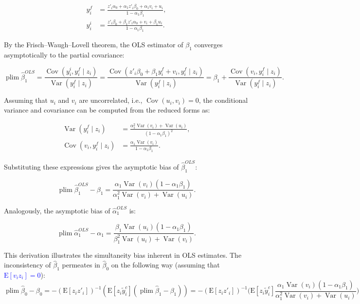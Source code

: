 \documentclass[12pt,oneside]{article}
\DeclareMathOperator*{\plim}{plim}
\theoremstyle{bracket}
\begin{document}
\begin{align}
    y^f_i &= \frac{z'_i \alpha_0 + \alpha_1 z'_i \beta_0 + \alpha_1 v_i + u_i}{1 - \alpha_1 \beta_1}, \\
    y^i_i &= \frac{z'_i \beta_0 + \beta_1 z'_i \alpha_0 + v_i + \beta_1 u_i}{1 - \alpha_1 \beta_1}.
\end{align}



By the Frisch–Waugh–Lovell theorem, the OLS estimator of $\beta_1$ converges asymptotically to the partial covariance:

\[
\plim \hat{\beta}_1^{OLS} = \frac{\operatorname{Cov}(y^i_i, y^f_i \mid z_i)}{\operatorname{Var}(y^f_i \mid z_i)}
= \frac{\operatorname{Cov}(z'_i \beta_0 + \beta_1 y^f_i + v_i, y^f_i \mid z_i)}{\operatorname{Var}(y^f_i \mid z_i)}
= \beta_1 + \frac{\operatorname{Cov}(v_i, y^f_i \mid z_i)}{\operatorname{Var}(y^f_i \mid z_i)}.
\]

Assuming that $u_i$ and $v_i$ are uncorrelated, i.e., $\operatorname{Cov}(u_i, v_i) = 0$, the conditional variance and covariance can be computed from the reduced forms as:

\begin{align}
    \operatorname{Var}(y^f_i \mid z_i) &= \frac{\alpha_1^2 \operatorname{Var}(v_i) + \operatorname{Var}(u_i)}{(1 - \alpha_1 \beta_1)^2}, \\
    \operatorname{Cov}(v_i, y^f_i \mid z_i) &= \frac{\alpha_1 \operatorname{Var}(v_i)}{1 - \alpha_1 \beta_1}.
\end{align}

Substituting these expressions gives the asymptotic bias of $\hat{\beta}_1^{OLS}$:

\[
\plim \hat{\beta}_1^{OLS} - \beta_1
= \frac{\alpha_1 \operatorname{Var}(v_i) (1 - \alpha_1 \beta_1)}{\alpha_1^2 \operatorname{Var}(v_i) + \operatorname{Var}(u_i)}.
\]

Analogously, the asymptotic bias of $\hat{\alpha}_1^{OLS}$ is:

\[
\plim \hat{\alpha}_1^{OLS} - \alpha_1
= \frac{\beta_1 \operatorname{Var}(u_i) (1 - \alpha_1 \beta_1)}{\beta_1^2 \operatorname{Var}(u_i) + \operatorname{Var}(v_i)}.
\]



This derivation illustrates the simultaneity bias inherent in OLS estimates.
The inconsistency of $\hat{\beta}_1$ permeates in $\hat{\beta}_0$ on the following way (assuming that \textcolor{blue}{$\mathrm{E}[v_iz_i]=0$}):
$$\plim \hat\beta_0-\beta_0 = -(\mathrm{E}[z_iz'_i])^{-1}(\mathrm{E}[z_i\tilde{y}_i^c](\plim \hat\beta_1-\beta_1))=-(\mathrm{E}[z_iz'_i])^{-1}\bigg( \mathrm{E}[z_i\tilde{y}_i^c]\frac{\alpha_1 \operatorname{Var}(v_i) (1 - \alpha_1 \beta_1)}{\alpha_1^2 \operatorname{Var}(v_i) + \operatorname{Var}(u_i)}\bigg)$$
\end{document}
